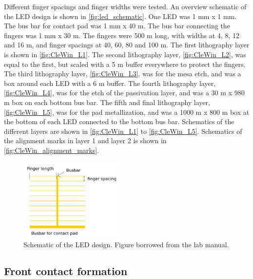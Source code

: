 \noindent Different finger spacings and finger widths were tested.
An overview schematic of the LED design is shown in \autoref{fig:led_schematic}.
One LED was 1 mm x 1 mm.
The bus bar for contact pad was 1 mm x 40 \textmu m.
The bus bar connecting the fingers was 1 mm x 30 \textmu m.
The fingers were 500 \textmu m long, with widths at 4, 8, 12 and 16 \textmu m, and finger spacings at 40, 60, 80 and 100 \textmu m.
The first lithography layer is shown in \autoref{fig:CleWin_L1}.
The second lithography layer, \autoref{fig:CleWin_L2}, was equal to the first, but scaled with a 5 \textmu m buffer everywhere to protect the fingers. 
The third lithography layer, \autoref{fig:CleWin_L3}, was for the mesa etch, and was a box around each LED with a 6 \textmu m buffer. 
The fourth lithography layer, \autoref{fig:CleWin_L4}, was for the etch of the passivation layer, and was a 30 \textmu m x 980 \textmu m box on each bottom bus bar. 
The fifth and final lithography layer, \autoref{fig:CleWin_L5}, was for the pad metallization, and was a 1000 \textmu m x 800 \textmu m box at the bottom of each LED connected to the bottom bus bar.
Schematics of the different layers are shown in \autoref{fig:CleWin_L1} to \autoref{fig:CleWin_L5}.
Schematics of the alignment marks in layer 1 and layer 2 is shown in \autoref{fig:CleWin_alignment_marks}.

\begin{figure}[ht]
    \centering
    \includegraphics[width=0.45\textwidth]{figures/LED_schematic.jpg}
    \caption{
        Schematic of the LED design.
        Figure borrowed from the lab manual.
    }
    \label{fig:led_schematic}
\end{figure}





\subsection{Front contact formation}
\label{methods:front_contact}

